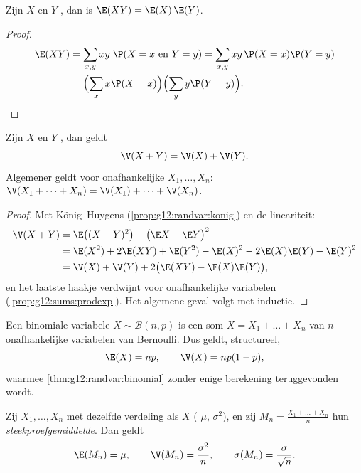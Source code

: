 \begin{proposition}\label{prop:g12:sums:prodexp}
Zijn $X$ en $Y$ , dan is $\E(XY) = \E(X)\,\E(Y)$.
\end{proposition}

\begin{proof}
\[
\begin{aligned}
\E(XY) &= \sum_{x, y} xy\;\P(X = x \text{ en } Y = y)
= \sum_{x, y} xy\,\P(X=x)\P(Y=y) \\
&= \Bigl(\sum_x x\P(X=x)\Bigr)\Bigl(\sum_y y\P(Y=y)\Bigr). \qedhere
\end{aligned}
\]
\end{proof}

\begin{theorem}\label{thm:g12:sums:variance}
Zijn $X$ en $Y$ \emph{}, dan geldt
\[
\V(X + Y) = \V(X) + \V(Y).
\]
Algemener geldt voor onafhankelijke $X_1, \dots, X_n$:
$\V(X_1 + \dots + X_n) = \V(X_1) + \dots + \V(X_n)$.
\end{theorem}

\begin{proof}
Met König--Huygens (\cref{prop:g12:randvar:konig}) en de lineariteit:
\begin{align*}
\V(X + Y) &= \E\bigl((X+Y)^2\bigr) - \bigl(\E X + \E Y\bigr)^2\\
&= \E(X^2) + 2\E(XY) + \E(Y^2)
- \E(X)^2 - 2\E(X)\E(Y) - \E(Y)^2\\
&= \V(X) + \V(Y) + 2\bigl(\E(XY) - \E(X)\E(Y)\bigr),
\end{align*}
en het laatste haakje verdwijnt voor onafhankelijke variabelen
(\cref{prop:g12:sums:prodexp}). Het algemene geval volgt met inductie.
\end{proof}

\begin{example}\label{ex:g12:sums:binomial}
Een binomiale variabele $X \sim \mathcal B(n, p)$ is een som
$X = X_1 + \dots + X_n$ van $n$ onafhankelijke variabelen van Bernoulli. Dus
geldt, structureel,
\[
\E(X) = np, \qquad \V(X) = np(1-p),
\]
waarmee \cref{thm:g12:randvar:binomial} zonder enige berekening teruggevonden
wordt.
\end{example}

\begin{proposition}[Steekproefgemiddelde]\label{prop:g12:sums:mean}
Zij $X_1, \dots, X_n$  met dezelfde verdeling als $X$
( $\mu$,  $\sigma^2$), en zij
$M_n = \frac{X_1 + \dots + X_n}{n}$ hun
\emph{steekproefgemiddelde}. Dan geldt
\[
\E(M_n) = \mu, \qquad \V(M_n) = \frac{\sigma^2}{n}, \qquad
\sigma(M_n) = \frac{\sigma}{\sqrt n}.
\]
\end{proposition}

